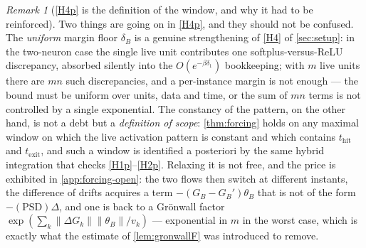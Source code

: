 \documentclass[11pt]{article}
\theoremstyle{definition}
\theoremstyle{remark}
\newtheorem{remark}[remark]{Remark}
\newcommand{\thit}{t_{\mathrm{hit}}}
\newcommand{\texit}{t_{\mathrm{exit}}}
\begin{document}
\begin{remark}[\eqref{H4p} is the definition of the window, and why it had to be
reinforced]\label{rem:H4F}
Two things are going on in \eqref{H4p}, and they should not be confused. The
\emph{uniform} margin floor $\delta_B$ is a genuine strengthening of \eqref{H4}
of \cref{sec:setup}: in the two-neuron case the single live unit contributes one
softplus-versus-ReLU discrepancy, absorbed silently into the
$O(e^{-\beta\delta_1})$ bookkeeping; with $m$ live units there are $mn$ such
discrepancies, and a per-instance margin is not enough --- the bound must be
uniform over units, data and time, or the sum of $mn$ terms is not controlled by
a single exponential. The constancy of the pattern, on the other hand, is not a
debt but a \emph{definition of scope}: \cref{thm:forcing} holds on any maximal
window on which the live activation pattern is constant and which contains
$\thit$ and $\texit$, and such a window is identified a posteriori by the same
hybrid integration that checks \eqref{H1p}--\eqref{H2p}. Relaxing it is not free, and
the price is exhibited in \cref{app:forcing-open}: the two flows then switch at
different instants, the difference of drifts acquires a term
$-(G_B-G_B')\theta_B$ that is not of the form $-(\text{PSD})\Delta$, and one is
back to a Gr\"onwall factor $\exp(\sum_k\|\Delta G_k\|\|\theta_B\|/v_k)$ ---
exponential in $m$ in the worst case, which is exactly what the estimate of
\cref{lem:gronwallF} was introduced to remove.
\end{remark}
\end{document}
